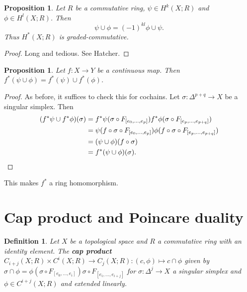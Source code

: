 \documentclass{article}
\newtheorem{definition}[theorem]{Definition}
\newtheorem{proposition}[theorem]{Proposition}
\begin{document}
\begin{proposition}
Let $R$ be a commutative ring, $\psi\in H^k(X;R)$ and $\phi\in H^l(X;R)$. Then \[\psi\cup\phi=(-1)^{kl}\phi\cup\psi.\] Thus $H^*(X;R)$ is graded-commutative.
\end{proposition}
\begin{proof}
Long and tedious. See Hatcher.
\end{proof}

\begin{proposition}
Let $f\colon X\to Y$ be a continuous map. Then $f^*(\psi\cup\phi)=f^*(\psi)\cup f^*(\phi)$.
\end{proposition}
\begin{proof}
As before, it suffices to check this for cochains. Let $\sigma\colon\Delta^{p+q}\to X$ be a singular simplex. Then 
\begin{align*}(f^*\psi\cup f^*\phi)(\sigma)&=f^*\psi(\sigma\circ F_{[e_0,...,e_p]})f^*\phi(\sigma\circ F_{[e_p,...,e_{p+q}]})\\&=\psi(f\circ\sigma\circ F_{[e_0,...,e_p]})\phi(f\circ\sigma\circ F_{[e_p,...,e_{p+q}]})\\&=(\psi\cup\phi)(f\circ\sigma)\\&=f^*(\psi\cup\phi)(\sigma).\qedhere
\end{align*}
\end{proof}

\noindent This makes $f^*$ a ring homomorphism.

\section{Cap product and Poincare duality}

\begin{definition}
Let $X$ be a topological space and $R$ a commutative ring with an identity element. The \textbf{cap product} $C_{i+j}(X;R)\times C^i(X;R)\to C_j(X;R):(c,\phi)\mapsto c\cap\phi$ given by $\sigma\cap\phi=\phi(\sigma\circ F_{[e_0,...,e_i]})\sigma\circ F_{[e_i,...,e_{i+j}]}$ for $\sigma\colon\Delta^j\to X$ a singular simplex and $\phi\in C^{i+j}(X;R)$ and extended linearly.
\end{definition}
\end{document}
